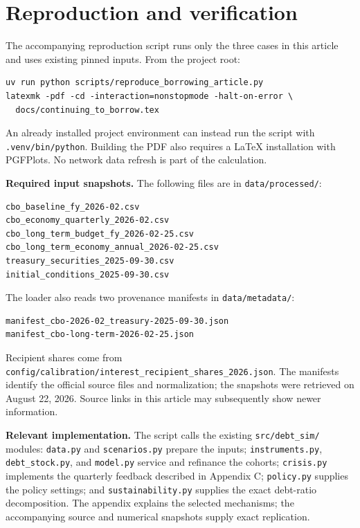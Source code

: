 \documentclass[11pt,letterpaper]{article}
\newcommand{\pathfile}[1]{\nolinkurl{#1}}
\begin{document}
\section{Reproduction and verification}

The accompanying reproduction script runs only the three cases in this
article and uses existing pinned inputs. From the project root:
\begin{Verbatim}[fontsize=\small]
uv run python scripts/reproduce_borrowing_article.py
latexmk -pdf -cd -interaction=nonstopmode -halt-on-error \
  docs/continuing_to_borrow.tex
\end{Verbatim}
An already installed project environment can instead run the script with
\pathfile{.venv/bin/python}. Building the PDF also requires a LaTeX installation
with PGFPlots. No network data refresh is part of the calculation.

\textbf{Required input snapshots.}
The following files are in \pathfile{data/processed/}:
\begin{Verbatim}[fontsize=\small]
cbo_baseline_fy_2026-02.csv
cbo_economy_quarterly_2026-02.csv
cbo_long_term_budget_fy_2026-02-25.csv
cbo_long_term_economy_annual_2026-02-25.csv
treasury_securities_2025-09-30.csv
initial_conditions_2025-09-30.csv
\end{Verbatim}
The loader also reads two provenance manifests in \pathfile{data/metadata/}:
\begin{Verbatim}[fontsize=\small]
manifest_cbo-2026-02_treasury-2025-09-30.json
manifest_cbo-long-term-2026-02-25.json
\end{Verbatim}
Recipient shares come from
\pathfile{config/calibration/interest_recipient_shares_2026.json}.
The manifests identify the official source files and normalization; the
snapshots were retrieved on August 22, 2026. Source links in this article
may subsequently show newer information.

\textbf{Relevant implementation.}
The script calls the existing \pathfile{src/debt_sim/} modules:
\pathfile{data.py} and \pathfile{scenarios.py} prepare the inputs;
\pathfile{instruments.py}, \pathfile{debt_stock.py}, and \pathfile{model.py}
service and refinance the cohorts; \pathfile{crisis.py} implements the
quarterly feedback described in Appendix C; \pathfile{policy.py} supplies
the policy settings; and \pathfile{sustainability.py} supplies the exact
debt-ratio decomposition. The appendix explains the selected mechanisms;
the accompanying source and numerical snapshots supply exact replication.
\end{document}
